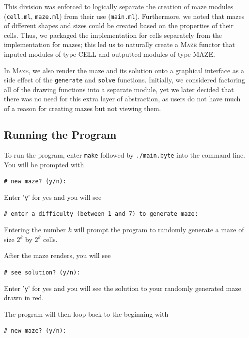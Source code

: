 \documentclass[11pt, margin=1in]{article}
\newcommand{\tab}{\par \qquad}
\begin{document}
This division was enforced to logically separate the creation of maze modules (\texttt{cell.ml}, \texttt{maze.ml}) from their use (\texttt{main.ml}).  Furthermore, we noted that mazes of different shapes and sizes could be created based on the properties of their cells.  Thus, we packaged the implementation for cells separately from the implementation for mazes; this led us to naturally create a \textsc{Maze} functor that inputed modules of type \textsc{CELL} and outputted modules of type \textsc{MAZE}.
\tab In \textsc{Maze}, we also render the maze and its solution onto a graphical interface as a side effect of the \texttt{generate} and \texttt{solve} functions.  Initially, we considered factoring all of the drawing functions into a separate module, yet we later decided that there was no need for this extra layer of abstraction, as users do not have much of a reason for creating mazes but not viewing them.     

\subsection{Running the Program} %
To run the program, enter \texttt{make} followed by \texttt{./main.byte} into the command line.  You will be prompted with

\begin{flushleft}
\quad \quad \texttt{\# new maze? (y/n): } 
\end{flushleft}

Enter '\texttt{y}' for yes and you will see

\begin{flushleft}
\quad \quad \texttt{\# enter a difficulty (between 1 and 7) to generate maze:}
\end{flushleft}


Entering the number $k$ will prompt the program to randomly generate a maze of size $2^k$ by $2^k$ cells.  

After the maze renders, you will see 

\begin{flushleft}
\quad \quad \texttt{\# see solution? (y/n):}
\end{flushleft}

Enter '\texttt{y}' for yes and you will see the solution to your randomly generated maze drawn in red.

 The program will then loop back to the beginning with 

\begin{flushleft}
\quad \quad \texttt{\# new maze? (y/n): } 
\end{flushleft}
\end{document}
